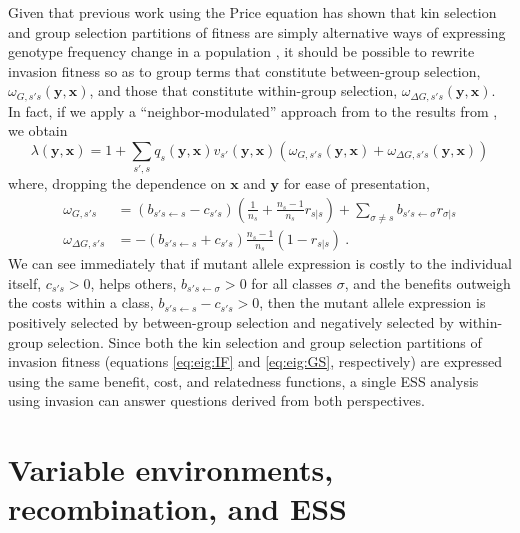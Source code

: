 \documentclass[11pt]{article}
\renewcommand{\vec}[1]{\symbf{#1}}
\newcommand{\eig}{\lambda}
\begin{document}
Given that previous work using the Price equation has shown that kin selection and group selection partitions of fitness are simply alternative ways of expressing genotype frequency change in a population \cite{Queller:1992,Bijma:Wade:2008,Gardner:West:2007,Marshall:2011,Akcay:VanCleve:2012}, it should be possible to rewrite invasion fitness so as to group terms that constitute between-group selection, $\omega_{G,s'\!s}(\vec{y}, \vec{x})$, and those that constitute within-group selection, $\omega_{\Delta G,s'\!s}(\vec{y}, \vec{x})$. In fact, if we apply a ``neighbor-modulated'' approach from \cite{Queller:1992,Akcay:VanCleve:2012} to the results from \cite{Lehmann:Rousset:2020}, we obtain
\begin{equation}
  \label{eq:eig:GS}
  \eig(\vec{y}, \vec{x}) = 1 + \sum_{s'\!,s} q_{s}(\vec{y}, \vec{x}) v_{s'}(\vec{y}, \vec{x})
  \left( \omega_{G,s'\!s}(\vec{y}, \vec{x}) + \omega_{\Delta G,s'\!s}(\vec{y}, \vec{x}) \right)
\end{equation}
where, dropping the dependence on $\vec{x}$ and $\vec{y}$ for ease of presentation,
\begin{equation}
  \label{eq:wg:wdeltag}
  \begin{split}
    \omega_{G,s'\!s} & = \left(b_{s'\!s \leftarrow s} - c_{s'\!s} \right) \left(\frac{1}{n_{s}} + \frac{n_{s}-1}{n_{s}} r_{s|s} \right) + \sum_{\sigma \ne s} b_{s'\!s \leftarrow \sigma} r_{\sigma|s} \\
    \omega_{\Delta G,s'\!s} & = - \left(b_{s'\!s \leftarrow s} + c_{s'\!s}\right) \frac{n_{s}-1}{n_{s}} \left( 1 - r_{s|s} \right) \: .
  \end{split}
\end{equation}
We can see immediately that if mutant allele expression is costly to the individual itself, $c_{s'\!s}>0$, helps others, $b_{s'\!s \leftarrow \sigma}>0$ for all classes $\sigma$, and the benefits outweigh the costs within a class, $b_{s'\!s \leftarrow s} - c_{s'\!s}>0$, then the mutant allele expression is positively selected by between-group selection and negatively selected by within-group selection. Since both the kin selection and group selection partitions of invasion fitness (equations \eqref{eq:eig:IF} and \eqref{eq:eig:GS}, respectively) are expressed using the same benefit, cost, and relatedness functions, a single ESS analysis using invasion can answer questions derived from both perspectives.

\section{Variable environments, recombination, and ESS}
\end{document}
